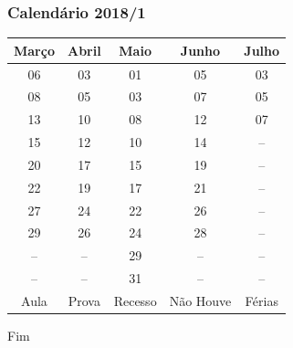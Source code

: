 \documentclass{beamer}
\begin{document}
\begin{frame}
\frametitle{Calendário 2018/1}
\begin{table}
\begin{tabular}{c c c c c}
\toprule
\textbf{Março} & \textbf{Abril} & \textbf{Maio} & \textbf{Junho} & \textbf{Julho}\\
\midrule
\cellcolor{green}06 & \cellcolor{green}03   & \cellcolor{cyan}01    & \cellcolor{green}05 & \cellcolor{magenta}03 \\
\cellcolor{green}08 & \cellcolor{green}05   & \cellcolor{green}03   & \cellcolor{green}07 & \cellcolor{magenta}05 \\
\cellcolor{green}13 & \cellcolor{magenta}10 & \cellcolor{green}08   & \cellcolor{green}12 & \cellcolor{yellow}07 \\
\cellcolor{green}15 & \cellcolor{green}12   & \cellcolor{green}10   & \cellcolor{green}14 & \cellcolor{gray}-- \\
\cellcolor{green}20 & \cellcolor{green}17   & \cellcolor{green}15   & \cellcolor{green}19 & \cellcolor{gray}-- \\
\cellcolor{green}22 & \cellcolor{green}19   & \cellcolor{green}17   & \cellcolor{green}21 & \cellcolor{gray}-- \\
\cellcolor{green}27 & \cellcolor{green}24   & \cellcolor{yellow}22  & \cellcolor{green}26 & \cellcolor{gray}-- \\
\cellcolor{cyan}29  & \cellcolor{green}26   & \cellcolor{magenta}24 & \cellcolor{green}28 & \cellcolor{gray}-- \\
\cellcolor{white}-- & \cellcolor{white}--   & \cellcolor{green}29   & \cellcolor{white}-- & \cellcolor{gray}-- \\
\cellcolor{white}-- & \cellcolor{white}--   & \cellcolor{cyan}31    & \cellcolor{white}-- & \cellcolor{gray}-- \\
\bottomrule
\cellcolor{green}Aula & \cellcolor{magenta}Prova & \cellcolor{cyan}Recesso & \cellcolor{yellow}Não Houve & \cellcolor{gray}Férias\\
\end{tabular}
\end{table}
\end{frame}


\begin{frame}
\Huge{\centerline{Fim}}
\end{frame}

\end{document}
